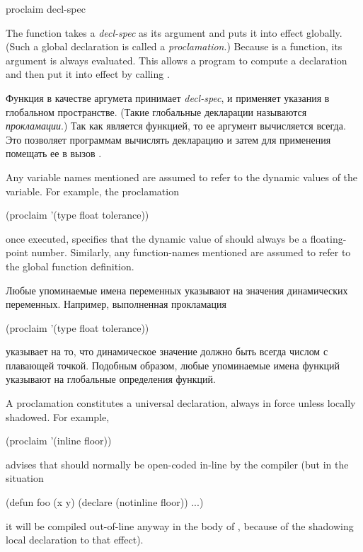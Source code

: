 \newpage%

\begin{defun}[Function]
proclaim decl-spec

The function  takes a \emph{decl-spec} as its
argument and puts it into effect globally.  (Such a global
declaration is called a \emph{proclamation}.)
Because  is a function, its argument is always evaluated.
This allows a program to compute a declaration and then put
it into effect by calling .

Функция  в качестве аргумета принимает \emph{decl-spec}, и
применяет указания в глобальном пространстве. (Такие глобальные декларации
называются \emph{прокламации}.)
Так как  является функцией, то ее аргумент вычисляется всегда.
Это позволяет программам вычислять декларацию и затем для применения помещать ее
в вызов .

Any variable names
mentioned are assumed to refer to the dynamic values of the
variable.  For example, the proclamation
\begin{lisp}
(proclaim '(type float tolerance))
\end{lisp}
once executed,
specifies that the dynamic value of  should always
be a floating-point number.
Similarly, any function-names mentioned are assumed to refer to
the global function definition.

Любые упоминаемые имена переменных указывают на значения
динамических переменных. Например, выполненная прокламация
\begin{lisp}
(proclaim '(type float tolerance))
\end{lisp}
указывает на то, что динамическое значение  должно быть всегда
числом с плавающей точкой.
Подобным образом, любые упоминаемые имена функций указывают на глобальные
определения функций.

A proclamation constitutes a universal declaration, always in force
unless locally shadowed.  For example,
\begin{lisp}
(proclaim '(inline floor))
\end{lisp}
advises that  should normally be open-coded in-line by the
compiler (but in the situation
\begin{lisp}
(defun foo (x y) (declare (notinline floor)) ...)
\end{lisp}
it will be compiled out-of-line anyway in the body of ,
because of the shadowing local declaration to that effect).


\end{defun}
